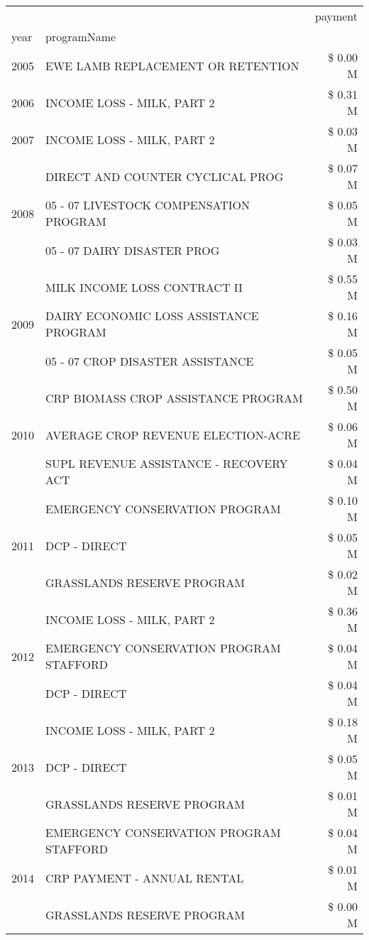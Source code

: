 \begin{tabular}{llr}
\toprule
 &  & payment \\
year & programName &  \\
\midrule
2005 & EWE LAMB REPLACEMENT OR RETENTION & \$ 0.00 M \\
\cline{1-3}
2006 & INCOME LOSS - MILK, PART 2 & \$ 0.31 M \\
\cline{1-3}
2007 & INCOME LOSS - MILK, PART 2 & \$ 0.03 M \\
\cline{1-3}
\multirow[t]{3}{*}{2008} & DIRECT AND COUNTER CYCLICAL PROG & \$ 0.07 M \\
 & 05 - 07 LIVESTOCK COMPENSATION PROGRAM & \$ 0.05 M \\
 & 05 - 07 DAIRY DISASTER PROG & \$ 0.03 M \\
\cline{1-3}
\multirow[t]{3}{*}{2009} & MILK INCOME LOSS CONTRACT II & \$ 0.55 M \\
 & DAIRY ECONOMIC LOSS ASSISTANCE PROGRAM & \$ 0.16 M \\
 & 05 - 07 CROP DISASTER ASSISTANCE & \$ 0.05 M \\
\cline{1-3}
\multirow[t]{3}{*}{2010} & CRP BIOMASS CROP ASSISTANCE PROGRAM & \$ 0.50 M \\
 & AVERAGE CROP REVENUE ELECTION-ACRE & \$ 0.06 M \\
 & SUPL REVENUE ASSISTANCE - RECOVERY ACT & \$ 0.04 M \\
\cline{1-3}
\multirow[t]{3}{*}{2011} & EMERGENCY CONSERVATION PROGRAM & \$ 0.10 M \\
 & DCP - DIRECT & \$ 0.05 M \\
 & GRASSLANDS RESERVE PROGRAM & \$ 0.02 M \\
\cline{1-3}
\multirow[t]{3}{*}{2012} & INCOME LOSS - MILK, PART 2 & \$ 0.36 M \\
 & EMERGENCY CONSERVATION PROGRAM STAFFORD & \$ 0.04 M \\
 & DCP - DIRECT & \$ 0.04 M \\
\cline{1-3}
\multirow[t]{3}{*}{2013} & INCOME LOSS - MILK, PART 2 & \$ 0.18 M \\
 & DCP - DIRECT & \$ 0.05 M \\
 & GRASSLANDS RESERVE PROGRAM & \$ 0.01 M \\
\cline{1-3}
\multirow[t]{3}{*}{2014} & EMERGENCY CONSERVATION PROGRAM STAFFORD & \$ 0.04 M \\
 & CRP PAYMENT - ANNUAL RENTAL & \$ 0.01 M \\
 & GRASSLANDS RESERVE PROGRAM & \$ 0.00 M \\
\cline{1-3}

\end{tabular}
